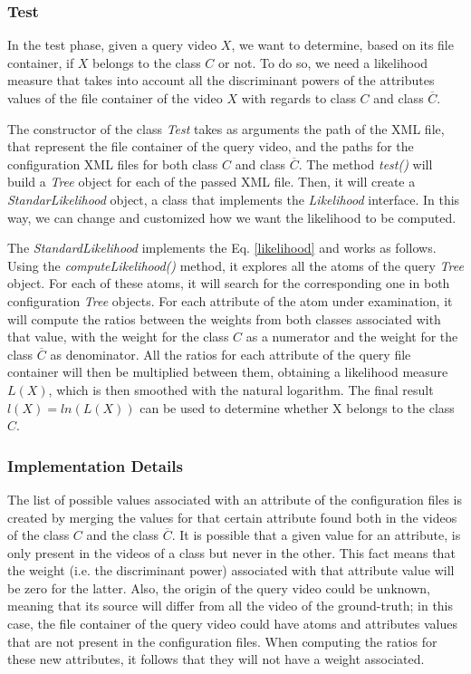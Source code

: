 \subsubsection*{Test}

In the test phase, given a query video $X$, we want to determine, based on its file container, if $X$ belongs to the class $C$ or not. To do so, we need a likelihood measure that takes into account all the discriminant powers of the attributes values of the file container of the video $X$ with regards to class $C$ and class $\overline{C}$.

The constructor of the class \emph{Test} takes as arguments the path of the XML file, that represent the file container of the query video, and the paths for the configuration XML files for both class $C$ and class $\overline{C}$.
The method \emph{test()} will build a \emph{Tree} object for each of the passed XML file. Then, it will create a \emph{StandarLikelihood} object, a class that implements the \emph{Likelihood} interface. In this way, we can change and customized how we want the likelihood to be computed.

The \emph{StandardLikelihood} implements the Eq. \ref{likelihood} and works as follows. Using the \emph{computeLikelihood()} method, it explores all the atoms of the query \emph{Tree} object. For each of these atoms, it will search for the corresponding one in both configuration \emph{Tree} objects. For each attribute of the atom under examination, it will compute the ratios between the weights from both classes associated with that value, with the weight for the class $C$ as a numerator and the weight for the class $\overline{C}$ as denominator. All the ratios for each attribute of the query file container will then be multiplied between them, obtaining a likelihood measure $L(X)$, which is then smoothed with the natural logarithm. 
The final result $l(X) = ln(L(X))$ can be used to determine whether X belongs to the class $C$.


\subsubsection*{Implementation Details}

The list of possible values associated with an attribute of the configuration files is created by merging the values for that certain attribute found both in the videos of the class $C$ and the class $\overline{C}$. It is possible that a given value for an attribute, is only present in the videos of a class but never in the other. This fact means that the weight (i.e. the discriminant power) associated with that attribute value will be zero for the latter.
Also, the origin of the query video could be unknown, meaning that its source will differ from all the video of the ground-truth; in this case, the file container of the query video could have atoms and attributes values that are not present in the configuration files. When computing the ratios for these new attributes, it follows that they will not have a weight associated.

